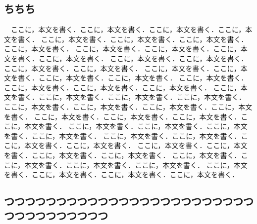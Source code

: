 \begin{center}
\section*{}                      %
\vspace*{-2zh}
\end{center}


\subsection{ちちち}
　ここに，本文を書く．ここに，本文を書く．ここに，本文を書く．ここに，本文を書く．
ここに，本文を書く．ここに，本文を書く．ここに，本文を書く．ここに，本文を書く．
ここに，本文を書く．ここに，本文を書く．ここに，本文を書く．ここに，本文を書く．
ここに，本文を書く．ここに，本文を書く．ここに，本文を書く．ここに，本文を書く．
ここに，本文を書く．ここに，本文を書く．ここに，本文を書く．ここに，本文を書く．
ここに，本文を書く．ここに，本文を書く．ここに，本文を書く．ここに，本文を書く．
ここに，本文を書く．ここに，本文を書く．ここに，本文を書く．ここに，本文を書く．
ここに，本文を書く．ここに，本文を書く．ここに，本文を書く．ここに，本文を書く．
ここに，本文を書く．ここに，本文を書く．ここに，本文を書く．ここに，本文を書く．
ここに，本文を書く．ここに，本文を書く．ここに，本文を書く．ここに，本文を書く．
ここに，本文を書く．ここに，本文を書く．ここに，本文を書く．ここに，本文を書く．
ここに，本文を書く．ここに，本文を書く．ここに，本文を書く．ここに，本文を書く．
ここに，本文を書く．ここに，本文を書く．ここに，本文を書く．ここに，本文を書く．
ここに，本文を書く．ここに，本文を書く．ここに，本文を書く．ここに，本文を書く．


\subsection{つつつつつつつつつつつつつつつつつつつつつつつつつつつつつつつつつつ}
